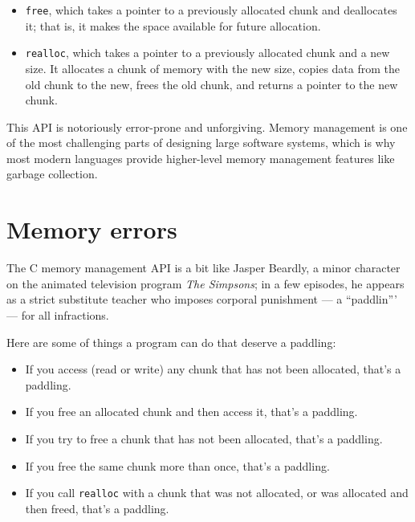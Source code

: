 \documentclass[12pt]{book}
\begin{document}
{\begin{itemize}
\item {\tt free}, which takes a pointer to a previously allocated
chunk and deallocates it; that is, it makes the space available for
future allocation.

\item {\tt realloc}, which takes a pointer to a previously allocated
chunk and a new size.  It allocates a chunk of memory with the new
size, copies data from the old chunk to the new, frees the old chunk,
and returns a pointer to the new chunk.

\end{itemize}

This API is notoriously error-prone and unforgiving.  Memory management
is one of the most challenging parts of designing large software systems,
which is why most modern languages provide higher-level memory
management features like garbage collection.


\section{Memory errors}

The C memory management API is a bit like Jasper Beardly, a minor
character on the animated television program {\it The Simpsons}; 
in a few episodes, he appears as a strict substitute teacher who imposes corporal punishment --- a ``paddlin''' --- for all infractions.

Here are some of things a program can do that deserve a paddling:

\begin{itemize}

\item If you access (read or write) any chunk that has not been
allocated, that's a paddling.

\item If you free an allocated chunk and then access it, that's
a paddling.

\item If you try to free a chunk that has not been allocated,
that's a paddling.

\item If you free the same chunk more than once, that's a paddling.

\item If you call {\tt realloc} with a chunk that was not allocated,
or was allocated and then freed, that's a paddling.

\end{itemize}

}
\end{document}
